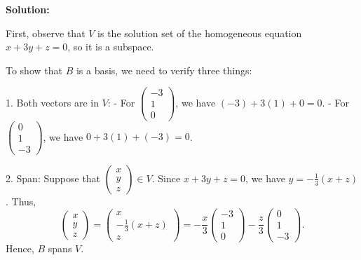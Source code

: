\documentclass[a4paper,12pt]{article}
\begin{document}
\textbf{Solution:}

First, observe that \( V \) is the solution set of the homogeneous equation \( x + 3y + z = 0 \), so it is a subspace.

To show that \( B \) is a basis, we need to verify three things:

1. Both vectors are in \( V \):
   - For \( \begin{pmatrix} -3 \\ 1 \\ 0 \end{pmatrix} \), we have \( (-3) + 3(1) + 0 = 0 \).
   - For \( \begin{pmatrix} 0 \\ 1 \\ -3 \end{pmatrix} \), we have \( 0 + 3(1) + (-3) = 0 \).

2. Span:
   Suppose that \( \begin{pmatrix} x \\ y \\ z \end{pmatrix} \in V \). Since \( x + 3y + z = 0 \), we have \( y = -\frac{1}{3}(x + z) \). Thus, 
   \[
   \begin{pmatrix} x \\ y \\ z \end{pmatrix} = \begin{pmatrix} x \\ -\frac{1}{3}(x + z) \\ z \end{pmatrix} = -\frac{x}{3} \begin{pmatrix} -3 \\ 1 \\ 0 \end{pmatrix} - \frac{z}{3} \begin{pmatrix} 0 \\ 1 \\ -3 \end{pmatrix}.
   \]
   Hence, \( B \) spans \( V \).
\end{document}
